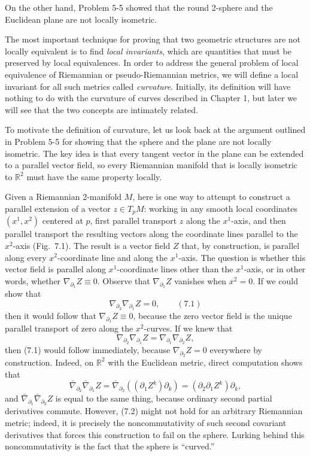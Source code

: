 On the other hand, Problem 5-5 showed that the round 2-sphere and the Euclidean plane are not locally isometric.

The most important technique for proving that two geometric structures are not locally equivalent is to find \emph{local invariants}, which are quantities that must be preserved by local equivalences. In order to address the general problem of local equivalence of Riemannian or pseudo-Riemannian metrics, we will define a local invariant for all such metrics called \emph{curvature}. Initially, its definition will have nothing to do with the curvature of curves described in Chapter 1, but later we will see that the two concepts are intimately related.

To motivate the definition of curvature, let us look back at the argument outlined in Problem 5-5 for showing that the sphere and the plane are not locally isometric. The key idea is that every tangent vector in the plane can be extended to a parallel vector field, so every Riemannian manifold that is locally isometric to $\mathbb{R}^2$ must have the same property locally.

Given a Riemannian 2-manifold $M$, here is one way to attempt to construct a parallel extension of a vector $z \in T_p M$: working in any smooth local coordinates $(x^1, x^2)$ centered at $p$, first parallel transport $z$ along the $x^1$-axis, and then parallel transport the resulting vectors along the coordinate lines parallel to the $x^2$-axis (Fig.~7.1). The result is a vector field $Z$ that, by construction, is parallel along every $x^2$-coordinate line and along the $x^1$-axis. The question is whether this vector field is parallel along $x^1$-coordinate lines other than the $x^1$-axis, or in other words, whether $\nabla_{\partial_1} Z \equiv 0$. Observe that $\nabla_{\partial_1} Z$ vanishes when $x^2 = 0$. If we could show that
\[
\nabla_{\partial_2} \nabla_{\partial_1} Z = 0, \qquad (7.1)
\]
then it would follow that $\nabla_{\partial_1} Z \equiv 0$, because the zero vector field is the unique parallel transport of zero along the $x^2$-curves. If we knew that
\begin{equation}
\nabla_{\partial_2} \nabla_{\partial_1} Z = \nabla_{\partial_1} \nabla_{\partial_2} Z,
\tag{7.2}
\end{equation}
then (7.1) would follow immediately, because $\nabla_{\partial_2} Z = 0$ everywhere by construction. Indeed, on $\mathbb{R}^2$ with the Euclidean metric, direct computation shows that
\[
\bar{\nabla}_{\partial_2} \bar{\nabla}_{\partial_1} Z = \bar{\nabla}_{\partial_2}((\partial_1 Z^k)\partial_k) = (\partial_2 \partial_1 Z^k)\partial_k,
\]
and $\bar{\nabla}_{\partial_1} \bar{\nabla}_{\partial_2} Z$ is equal to the same thing, because ordinary second partial derivatives commute. However, (7.2) might not hold for an arbitrary Riemannian metric; indeed, it is precisely the noncommutativity of such second covariant derivatives that forces this construction to fail on the sphere. Lurking behind this noncommutativity is the fact that the sphere is ``curved.''

